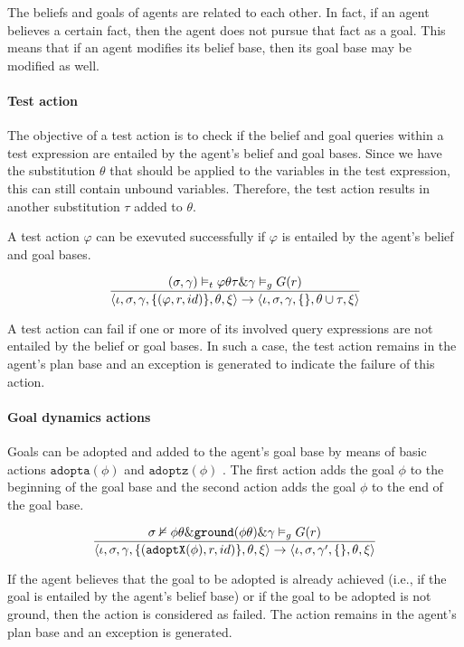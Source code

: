 \documentclass[a4paper]{article}
\begin{document}
The beliefs and goals of agents are related to each other. In fact, if an agent believes a
certain fact, then the agent does not pursue that fact as a goal. This means that if an agent
modifies its belief base, then its goal base may be modified as well.

\paragraph{Test action}

The objective of a test action is to check if the belief and goal queries within a test expression are entailed by the agent's belief and goal bases. Since we have the substitution $\theta$ that should be applied to the variables in the test expression, this can still contain unbound variables. Therefore, the test action results in another substitution $\tau$ added to $\theta$.

A test action $\varphi$ can be exevuted successfully if $\varphi$ is entailed by the agent's belief and goal bases.

$$ {{( \sigma, \gamma) \vDash_{t} \varphi \theta \tau \& \gamma \vDash_{g} G(r)}\over{\langle \iota, \sigma, \gamma, \{(\varphi, r, id)\}, \theta, \xi \rangle  \rightarrow \langle \iota, \sigma, \gamma, \{\}, \theta \cup \tau, \xi \rangle}} $$

A test action can fail if one or more of its involved query expressions are not entailed by the belief or goal bases. In such a case, the test action remains in the agent's plan base and an exception is generated to indicate the failure of this action.

\paragraph{Goal dynamics actions}

Goals can be adopted and added to the agent's goal base by means of basic actions $\texttt{adopta}(\phi)$ and $\texttt{adoptz}(\phi)$ . The first action adds the goal $\phi$ to the beginning of the goal base and the second action adds the goal $\phi$ to the end of the goal base.

$$ {{{\sigma \nvDash \phi \theta} \& {\texttt{ground}(\phi \theta)} \& {\gamma \vDash_{g} G(r)}}\over{\langle \iota, \sigma, \gamma, \{(\texttt{adoptX}(\phi), r, id)\}, \theta, \xi \rangle  \rightarrow \langle \iota, \sigma, \gamma', \{\}, \theta, \xi \rangle}} $$

If the agent believes that the goal to be adopted is already achieved (i.e., if the goal is entailed by the agent's belief base) or if the goal to be adopted is not ground, then the action is considered as failed. The action remains in the agent’s plan base and an exception is generated.
\end{document}
